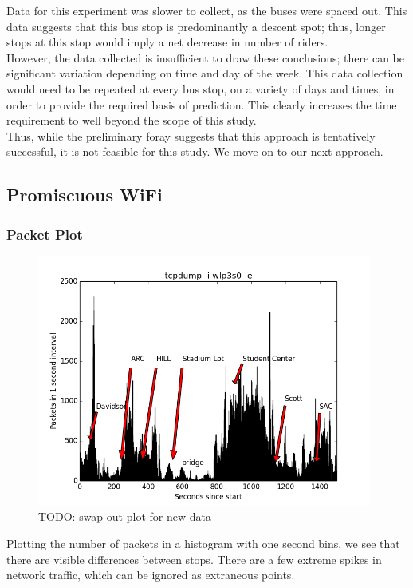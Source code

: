 \documentclass[letterpaper,abstract=on,titlepage=false]{scrreprt}
\begin{document}
	Data for this experiment was slower to collect, as the buses were spaced out.
	This data suggests that this bus stop is predominantly a descent spot; thus, longer stops at this stop would imply a net decrease in number of riders.
	\\
	However, the data collected is insufficient to draw these conclusions; there can be significant variation depending on time and day of the week.
	This data collection would need to be repeated at every bus stop, on a variety of days and times, in order to provide the required basis of prediction.
	This clearly increases the time requirement to well beyond the scope of this study.
	\\
	Thus, while the preliminary foray suggests that this approach is tentatively successful, it is not feasible for this study.
	We move on to our next approach.


\subsection*{Promiscuous WiFi}


	\subsubsection*{Packet Plot}

		\begin{figure}[H]
		\includegraphics[width=11cm]{packets}
		\\TODO: swap out plot for new data
		\centering
		\end{figure}

		Plotting the number of packets in a histogram with one second bins, we see that there are visible differences between stops.
		There are a few extreme spikes in network traffic, which can be ignored as extraneous points.
\end{document}
